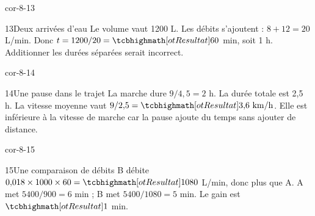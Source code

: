 \begin{blocLivre}{cor-8-13}\begin{corrige}{13}{Deux arrivées d’eau}
Le volume vaut 1200 L. Les débits s’ajoutent : $8+12=20$ L/min. Donc $t=1200/20=\res{60}$ min, soit 1 h. Additionner les durées séparées serait incorrect.
\end{corrige}\end{blocLivre}
\begin{blocLivre}{cor-8-14}\begin{corrige}{14}{Une pause dans le trajet}
La marche dure $9/4{,}5=2$ h. La durée totale est 2,5 h. La vitesse moyenne vaut $9/2{,}5=\res{3{,}6\ \mathrm{km/h}}$. Elle est inférieure à la vitesse de marche car la pause ajoute du temps sans ajouter de distance.
\end{corrige}\end{blocLivre}
\begin{blocLivre}{cor-8-15}\begin{corrige}{15}{Une comparaison de débits}
B débite $0{,}018\times1000\times60=\res{1080}$ L/min, donc plus que A. A met $5400/900=6$ min ; B met $5400/1080=5$ min. Le gain est $\res1$ min.
\end{corrige}\end{blocLivre}
